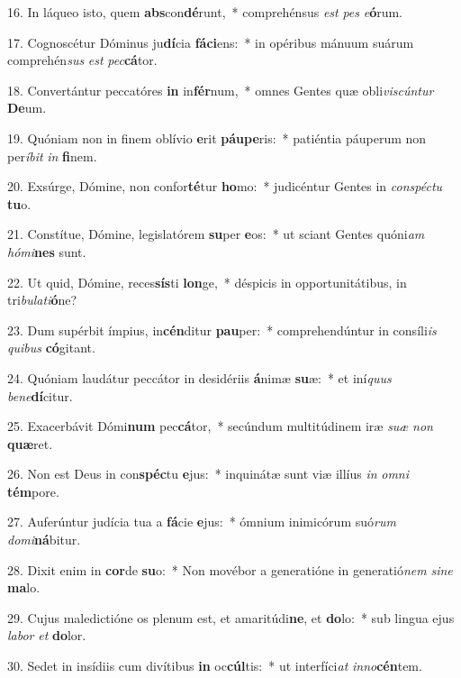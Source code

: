 16. In láqueo isto, quem \textbf{abs}con\textbf{dé}runt,~*  comprehénsus \textit{est} \textit{pes} \textit{e}\textbf{ó}rum.\

17. Cognoscétur Dóminus ju\textbf{dí}cia \textbf{fá}\textbf{ci}ens:~*  in opéribus mánuum suárum comprehén\textit{sus} \textit{est} \textit{pec}\textbf{cá}tor.\

18. Convertántur peccatóres \textbf{in} in\textbf{fér}num,~*  omnes Gentes quæ obli\textit{vis}\textit{cún}\textit{tur} \textbf{De}um.\

19. Quóniam non in finem oblívio \textbf{e}rit \textbf{páu}\textbf{pe}ris:~*  patiéntia páuperum non per\textit{í}\textit{bit} \textit{in} \textbf{fi}nem.\

20. Exsúrge, Dómine, non confor\textbf{té}tur \textbf{ho}mo:~*  judicéntur Gentes in \textit{con}\textit{spéc}\textit{tu} \textbf{tu}o.\

21. Constítue, Dómine, legislatórem \textbf{su}per \textbf{e}os:~*  ut sciant Gentes quóni\textit{am} \textit{hó}\textit{mi}\textbf{nes} sunt.\

22. Ut quid, Dómine, reces\textbf{sís}ti \textbf{lon}ge,~*  déspicis in opportunitátibus, in tri\textit{bu}\textit{la}\textit{ti}\textbf{ó}ne?\

23. Dum supérbit ímpius, in\textbf{cén}ditur \textbf{pau}per:~*  comprehendúntur in consíli\textit{is} \textit{qui}\textit{bus} \textbf{có}gitant.\

24. Quóniam laudátur peccátor in desidériis \textbf{á}nimæ \textbf{su}æ:~*  et iní\textit{quus} \textit{be}\textit{ne}\textbf{dí}citur.\

25. Exacerbávit Dómi\textbf{num} pec\textbf{cá}tor,~*  secúndum multitúdinem iræ \textit{su}\textit{æ} \textit{non} \textbf{quæ}ret.\

26. Non est Deus in con\textbf{spéc}tu \textbf{e}jus:~*  inquinátæ sunt viæ illíus \textit{in} \textit{om}\textit{ni} \textbf{tém}pore.\

27. Auferúntur judícia tua a \textbf{fá}cie \textbf{e}jus:~*  ómnium inimicórum suó\textit{rum} \textit{do}\textit{mi}\textbf{ná}bitur.\

28. Dixit enim in \textbf{cor}de \textbf{su}o:~*  Non movébor a generatióne in generatió\textit{nem} \textit{si}\textit{ne} \textbf{ma}lo.\

29. Cujus maledictióne os plenum est, et amaritúdi\textbf{ne}, et \textbf{do}lo:~*  sub lingua ejus \textit{la}\textit{bor} \textit{et} \textbf{do}lor.\

30. Sedet in insídiis cum divítibus \textbf{in} oc\textbf{cúl}tis:~*  ut interfíci\textit{at} \textit{in}\textit{no}\textbf{cén}tem.\

